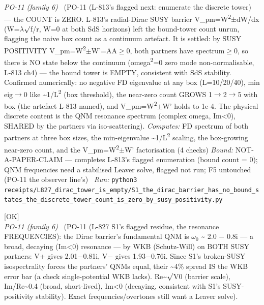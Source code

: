 \begin{description}
\textit{PO-11 (family 6)} \ (PO-11 (L-813's flagged next: enumerate the discrete tower) --- the COUNT is ZERO. L-813's radial-Dirac SUSY barrier V\_pm=W\textsuperscript{2}\ensuremath{\pm}dW/dx (W=\ensuremath{\lambda}\ensuremath{\surd}f/r, W=0 at both SdS horizons) left the bound-tower count unrun, flagging the naive box count as a continuum artefact. It is settled: by SUSY POSITIVITY V\_pm=W\textsuperscript{2}\ensuremath{\pm}W'=A\textdagger{}A\ensuremath{\ge}0, both partners have spectrum\ensuremath{\ge}0, so there is NO state below the continuum (omega\textsuperscript{2}=0 zero mode non-normalisable, L-813 ch4) --- the bound tower is EMPTY, consistent with SdS stability. Confirmed numerically: no negative FD eigenvalue at any box (L=10/20/40), min eig\ensuremath{\to}0 like \textasciitilde{}1/L\textsuperscript{2} (box threshold), the near-zero count GROWS 1\ensuremath{\to}2\ensuremath{\to}5 with box (the artefact L-813 named), and V\_pm=W\textsuperscript{2}\ensuremath{\pm}W' holds to 1e-4. The physical discrete content is the QNM resonance spectrum (complex omega, Im<0), SHARED by the partners via iso-scattering). 
\emph{Computes:} FD spectrum of both partners at three box sizes, the min-eigenvalue \textasciitilde{}1/L\textsuperscript{2} scaling, the box-growing near-zero count, and the V\_pm=W\textsuperscript{2}\ensuremath{\pm}W' factorisation (4 checks)
 \emph{Bound:} NOT-A-PAPER-CLAIM --- completes L-813's flagged enumeration (bound count = 0); QNM frequencies need a stabilised Leaver solve, flagged not run; F5 untouched (PO-11 the observer line's)
\ \emph{Run:} \texttt{python3 receipts/L827\_dirac\_tower\_is\_empty/S1\_the\_dirac\_barrier\_has\_no\_bound\_states\_the\_discrete\_tower\_count\_is\_zero\_by\_susy\_positivity.py}
\item[\label{rcpt:S2_the_fundamental_resonance_is_omega_two_minus_pt_eight_i_by_wkb_both_partners_agreeing}\texttt{S2\_the\_fundamental\_resonance\_is\_omega\_two\_minus\_pt\_eight\_i\_by\_wkb\_both\_partners\_agreeing}]\hfill\textsf{[OK]}\\
\textit{PO-11 (family 6)} \ (PO-11 (L-827 S1's flagged residue, the resonance FREQUENCIES): the Dirac barrier's fundamental QNM is \ensuremath{\omega}\ensuremath{_0} \textasciitilde{} 2.0 \ensuremath{-} 0.8i --- a broad, decaying (Im<0) resonance --- by WKB (Schutz-Will) on BOTH SUSY partners: V+ gives 2.01\ensuremath{-}0.81i, V\ensuremath{-} gives 1.93\ensuremath{-}0.76i. Since S1's broken-SUSY isospectrality forces the partners' QNMs equal, their \textasciitilde{}4\% spread IS the WKB error bar (a check single-potential WKB lacks). Re\textasciitilde{}\ensuremath{\surd}V0 (barrier scale), \textbar{}Im/Re\textbar{}\textasciitilde{}0.4 (broad, short-lived), Im<0 (decaying, consistent with S1's SUSY-positivity stability). Exact frequencies/overtones still want a Leaver solve). 

\end{description}
